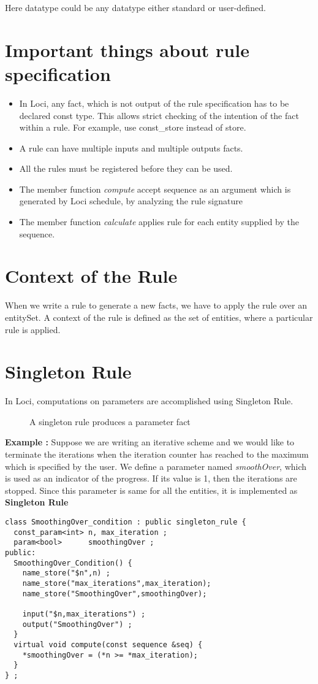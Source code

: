 \par Here datatype could be any datatype either standard or user-defined.

\section { Important things about rule specification }
\begin{itemize}
\item In Loci, any fact, which is not output of the rule specification
has to be declared const type. This allows strict checking of the intention of the fact
within a rule. For example, use const\_store instead of store.
%
\item A rule can have multiple inputs and multiple outputs facts.
%
\item All the rules must be registered before they can be used. 
%
\item The member function {\em compute} accept sequence as an 
argument which is generated by Loci schedule, by analyzing the rule signature 
%
\item The member function {\em calculate} applies rule for each entity
supplied by the sequence.
\end{itemize}
%
\section {Context of the Rule}
When we write a rule to generate a new facts, we have to apply the rule over an 
entitySet.  A context of the rule is defined as the set of entities, where a particular 
rule is applied.  
%
\section { Singleton Rule }
In Loci, computations on parameters are accomplished using Singleton Rule.
%
\begin{figure}[h]
\vspace{3.50in}\caption { A singleton rule produces a parameter fact}
\end{figure}
%
\par {\bf Example :} Suppose we are writing an iterative scheme and we 
would like to terminate the iterations when the iteration counter has
reached to the maximum which is specified by the user. We define a parameter named 
{\em smoothOver}, which is used as an indicator of the progress. If its value is 1, then the
iterations are stopped. Since this parameter is same for all the entities,
it is implemented as {\bf Singleton Rule }
\begin{verbatim}
class SmoothingOver_condition : public singleton_rule {
  const_param<int> n, max_iteration ;
  param<bool>      smoothingOver ;
public:
  SmoothingOver_Condition() {
    name_store("$n",n) ;
    name_store("max_iterations",max_iteration);
    name_store("SmoothingOver",smoothingOver);
    
    input("$n,max_iterations") ;
    output("SmoothingOver") ;
  }
  virtual void compute(const sequence &seq) {
    *smoothingOver = (*n >= *max_iteration);
  }
} ;
\end{verbatim}

